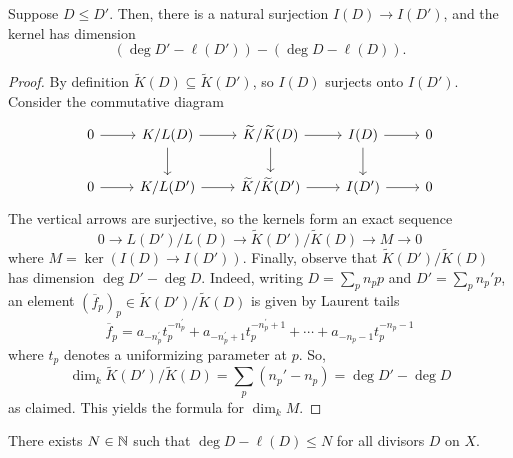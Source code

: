 \begin{lemma}\label{lemm:inequality-divisors-yields-surjection}
	Suppose $D\leq D'$. Then, there is a natural surjection $I(D) \to I(D')$, and the kernel has dimension
	\[
		(\deg D' - \ell(D')) - (\deg D - \ell(D)).
	\]
\end{lemma}
\begin{proof}
	By definition $\widetilde{K}(D) \subseteq \widetilde{K}(D')$, so $I(D)$ surjects onto $I(D')$. Consider the commutative diagram 
	\[
	\begin{tikzcd}
		0  \ar[r] &  K/L(D) \ar[d] \ar[r] & \widetilde{K}/\widetilde{K}(D) \ar[d] \ar[r] & I(D) \ar[d] \ar[r] & 0 \\
		0 \ar[r] &  K/L(D')  \ar[r] & \widetilde{K}/\widetilde{K}(D')  \ar[r] & I(D')  \ar[r] & 0
	\end{tikzcd}
	\]
	The vertical arrows are surjective, so the kernels form an exact sequence
	\[
	0 \to L(D')/L(D) \to \widetilde{K}(D')/\widetilde{K}(D) \to M \to 0
	\]
	where $M = \ker(I(D) \to I(D'))$. Finally, observe that $\widetilde{K}(D')/\widetilde{K}(D)$ has dimension $\deg D' - \deg D$. Indeed, writing $D = \sum_{p}n_{p}p$ and $D' = \sum_{p}n_{p}'p$, an element $(\overline{f}_{p})_{p} \in \widetilde{K}(D')/\widetilde{K}(D)$ is given by Laurent tails 
	\[
	 \overline{f}_{p} =  a _ { - n _ { p } ^ { \prime } } t_{p} ^ { - n _ { p } ^ { \prime } } + a _ { - n _ { p } ^ { \prime } + 1 } t_{p} ^ { - n _ { p } ^ { \prime } + 1 } + \cdots + a _ { - n _ { p } - 1 } t_{p} ^ { - n _ { p } - 1 }
	\]
	where $t_{p}$ denotes a uniformizing parameter at $p$. So, 
	\[
		\dim_{k} \widetilde{K}(D')/\widetilde{K}(D) = \sum_{p}(n_{p}' - n_{p}) = \deg D' - \deg D
	\]
	as claimed. This yields the formula for $\dim_{k}M$.
\end{proof}
\begin{lemma}\label{lemm:bound-on-L(D)}
	There exists $N \in {\mathbb N}$ such that $\deg D - \ell(D)\leq N$ for all divisors $D$ on $X$.
\end{lemma}
